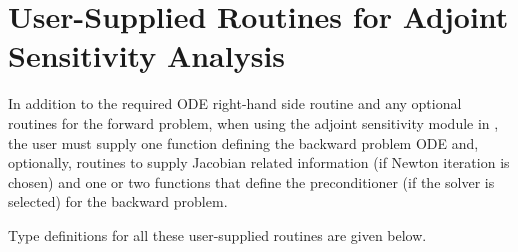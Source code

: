 \section{User-Supplied Routines for Adjoint Sensitivity Analysis}\label{ss:user_fct_adj}

In addition to the required ODE right-hand side routine and any optional routines
for the forward problem, when using the adjoint sensitivity module in {\cvodes},
the user must supply one function defining the backward problem ODE and, optionally,
routines to supply Jacobian related information (if Newton iteration is chosen) and
one or two functions that define the preconditioner (if the {\cvspgmr} solver is
selected) for the backward problem.

Type definitions for all these user-supplied routines are given below.

